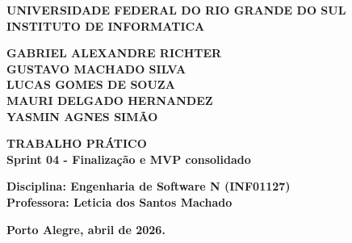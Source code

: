 \begin{center}

    \thispagestyle{empty}
    
    \textbf{UNIVERSIDADE FEDERAL DO RIO GRANDE DO SUL}\\
    \textbf{INSTITUTO DE INFORMATICA}\\
    \vspace{3cm}

    \textbf{GABRIEL ALEXANDRE RICHTER}\\
    \textbf{GUSTAVO MACHADO SILVA}\\
    \textbf{LUCAS GOMES DE SOUZA}\\
    \textbf{MAURI DELGADO HERNANDEZ}\\
    \textbf{YASMIN AGNES SIMÃO}\\
    \vspace{4cm}
    
    \textbf{TRABALHO PRÁTICO}\\
    \textbf{Sprint 04 - Finalização e MVP consolidado}\\
    \vspace{5cm}

    \textbf{Disciplina: Engenharia de Software N (INF01127)}\\
    \textbf{Professora: Leticia dos Santos Machado}\\
    \vspace{5cm}

    \textbf{Porto Alegre, abril de 2026.}\\
    
\end{center}